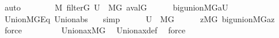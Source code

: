 \begin{isabellebody}
\ auto\isanewline
\ \ \ \ \isamarkupfalse%
\ {\isacartoucheopen}{\isasymtau}\ {\isasymin}\ M{\isacartoucheclose}\ {\isacartoucheopen}filter{\isacharparenleft}{\kern0pt}G{\isacharparenright}{\kern0pt}{\isacartoucheclose}\ {\isacartoucheopen}{\isacharquery}{\kern0pt}U\ {\isasymin}\ M{\isacharbrackleft}{\kern0pt}G{\isacharbrackright}{\kern0pt}{\isacartoucheclose}\ {\isacartoucheopen}a{\isacharequal}{\kern0pt}val{\isacharparenleft}{\kern0pt}G{\isacharcomma}{\kern0pt}{\isasymtau}{\isacharparenright}{\kern0pt}{\isacartoucheclose}\isanewline
\ \ \ \ \isamarkupfalse%
\ {\isachardoublequoteopen}big{\isacharunderscore}{\kern0pt}union{\isacharparenleft}{\kern0pt}{\isacharhash}{\kern0pt}{\isacharhash}{\kern0pt}M{\isacharbrackleft}{\kern0pt}G{\isacharbrackright}{\kern0pt}{\isacharcomma}{\kern0pt}a{\isacharcomma}{\kern0pt}{\isacharquery}{\kern0pt}U{\isacharparenright}{\kern0pt}{\isachardoublequoteclose}\isanewline
\ \ \ \ \ \ \isamarkupfalse%
\ Union{\isacharunderscore}{\kern0pt}MG{\isacharunderscore}{\kern0pt}Eq\ Union{\isacharunderscore}{\kern0pt}abs\ \ \isamarkupfalse%
\ simp\isanewline
\ \ \ \ \isamarkupfalse%
\ {\isacartoucheopen}{\isacharquery}{\kern0pt}U\ {\isasymin}\ M{\isacharbrackleft}{\kern0pt}G{\isacharbrackright}{\kern0pt}{\isacartoucheclose}\isanewline
\ \ \ \ \isamarkupfalse%
\ {\isachardoublequoteopen}{\isasymexists}z{\isacharbrackleft}{\kern0pt}{\isacharhash}{\kern0pt}{\isacharhash}{\kern0pt}M{\isacharbrackleft}{\kern0pt}G{\isacharbrackright}{\kern0pt}{\isacharbrackright}{\kern0pt}{\isachardot}{\kern0pt}\ big{\isacharunderscore}{\kern0pt}union{\isacharparenleft}{\kern0pt}{\isacharhash}{\kern0pt}{\isacharhash}{\kern0pt}M{\isacharbrackleft}{\kern0pt}G{\isacharbrackright}{\kern0pt}{\isacharcomma}{\kern0pt}a{\isacharcomma}{\kern0pt}z{\isacharparenright}{\kern0pt}{\isachardoublequoteclose}\ \isamarkupfalse%
\ force\isanewline
\ \ \isacommand{{\isacharbraceright}{\kern0pt}}\isamarkupfalse%
\isanewline
\ \ \isamarkupfalse%
\isanewline
\ \ \isamarkupfalse%
\ {\isachardoublequoteopen}Union{\isacharunderscore}{\kern0pt}ax{\isacharparenleft}{\kern0pt}{\isacharhash}{\kern0pt}{\isacharhash}{\kern0pt}M{\isacharbrackleft}{\kern0pt}G{\isacharbrackright}{\kern0pt}{\isacharparenright}{\kern0pt}{\isachardoublequoteclose}\ \isamarkupfalse%
\ Union{\isacharunderscore}{\kern0pt}ax{\isacharunderscore}{\kern0pt}def\ \isamarkupfalse%
\ force\isanewline
\ \ \isamarkupfalse%
\isanewline

\end{isabellebody}
